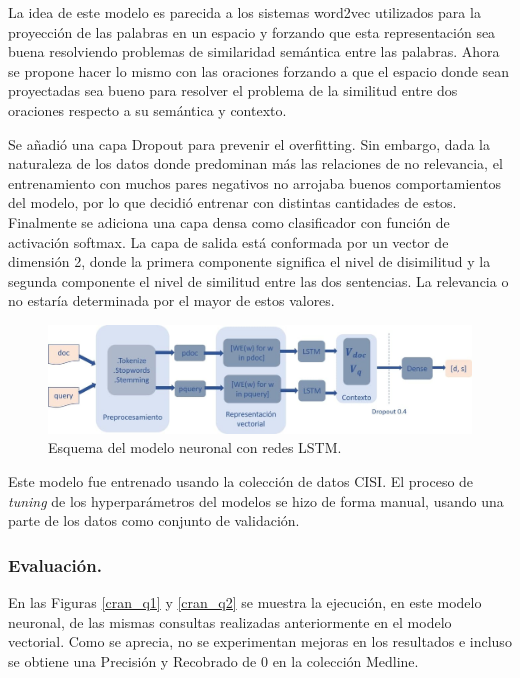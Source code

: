 \documentclass{llncs}
\begin{document}
La idea de este modelo es parecida a los sistemas word2vec utilizados para la proyección de las palabras en un espacio y forzando que esta representación sea buena resolviendo problemas de similaridad semántica entre las palabras. Ahora se propone hacer lo mismo con las oraciones forzando a que el espacio donde sean proyectadas sea bueno para resolver el problema de la similitud entre dos oraciones respecto a su semántica y contexto. 

Se añadió una capa Dropout para prevenir el overfitting. Sin embargo, dada la naturaleza de los datos donde predominan más las relaciones de no relevancia, el entrenamiento con muchos pares negativos no arrojaba buenos comportamientos del modelo, por lo que decidió entrenar con distintas cantidades de estos. Finalmente se adiciona una capa densa como clasificador con función de activación softmax. La capa de salida está conformada por un vector de dimensión 2, donde la primera componente significa el nivel de disimilitud y la segunda componente el nivel de similitud entre las dos sentencias. La relevancia o no estaría determinada por el mayor de estos valores.

\begin{figure}
	\begin{center}
		\includegraphics[width=\linewidth]{ ./images/lstm.jpg}
		\caption{Esquema del modelo neuronal con redes LSTM.}
		\label{lstm}
	\end{center}
\end{figure}

Este modelo fue entrenado usando la colección de datos CISI. El proceso de \textit{tuning} de los hyperparámetros del modelos se hizo de forma manual, usando una parte de los datos como conjunto de validación.




\subsubsection{Evaluación.}

   En las Figuras \ref{cran_q1} y \ref{cran_q2} se muestra la ejecución, en este modelo neuronal, de las mismas consultas realizadas anteriormente en el modelo vectorial. Como se aprecia, no se experimentan mejoras en los resultados e incluso se obtiene una Precisión y Recobrado de 0 en la colección Medline. 
\end{document}

